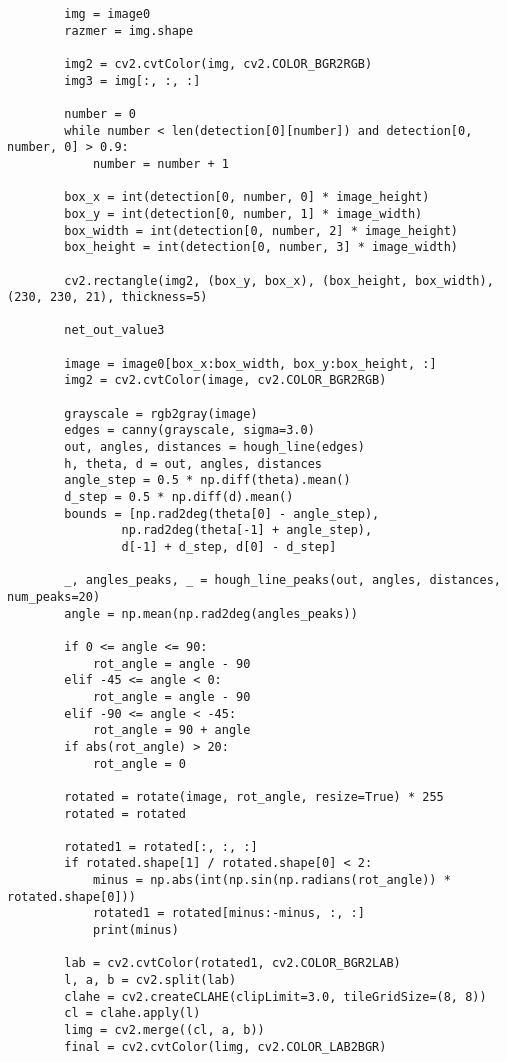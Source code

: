 \begin{lstlisting}
        img = image0
        razmer = img.shape

        img2 = cv2.cvtColor(img, cv2.COLOR_BGR2RGB)
        img3 = img[:, :, :]

        number = 0
        while number < len(detection[0][number]) and detection[0, number, 0] > 0.9:
            number = number + 1

        box_x = int(detection[0, number, 0] * image_height)
        box_y = int(detection[0, number, 1] * image_width)
        box_width = int(detection[0, number, 2] * image_height)
        box_height = int(detection[0, number, 3] * image_width)

        cv2.rectangle(img2, (box_y, box_x), (box_height, box_width), (230, 230, 21), thickness=5)

        net_out_value3

        image = image0[box_x:box_width, box_y:box_height, :]
        img2 = cv2.cvtColor(image, cv2.COLOR_BGR2RGB)

        grayscale = rgb2gray(image)
        edges = canny(grayscale, sigma=3.0)
        out, angles, distances = hough_line(edges)
        h, theta, d = out, angles, distances
        angle_step = 0.5 * np.diff(theta).mean()
        d_step = 0.5 * np.diff(d).mean()
        bounds = [np.rad2deg(theta[0] - angle_step),
                np.rad2deg(theta[-1] + angle_step),
                d[-1] + d_step, d[0] - d_step]

        _, angles_peaks, _ = hough_line_peaks(out, angles, distances, num_peaks=20)
        angle = np.mean(np.rad2deg(angles_peaks))

        if 0 <= angle <= 90:
            rot_angle = angle - 90
        elif -45 <= angle < 0:
            rot_angle = angle - 90
        elif -90 <= angle < -45:
            rot_angle = 90 + angle
        if abs(rot_angle) > 20:
            rot_angle = 0

        rotated = rotate(image, rot_angle, resize=True) * 255
        rotated = rotated

        rotated1 = rotated[:, :, :]
        if rotated.shape[1] / rotated.shape[0] < 2:
            minus = np.abs(int(np.sin(np.radians(rot_angle)) * rotated.shape[0]))
            rotated1 = rotated[minus:-minus, :, :]
            print(minus)

        lab = cv2.cvtColor(rotated1, cv2.COLOR_BGR2LAB)
        l, a, b = cv2.split(lab)
        clahe = cv2.createCLAHE(clipLimit=3.0, tileGridSize=(8, 8))
        cl = clahe.apply(l)
        limg = cv2.merge((cl, a, b))
        final = cv2.cvtColor(limg, cv2.COLOR_LAB2BGR)


\end{lstlisting}
